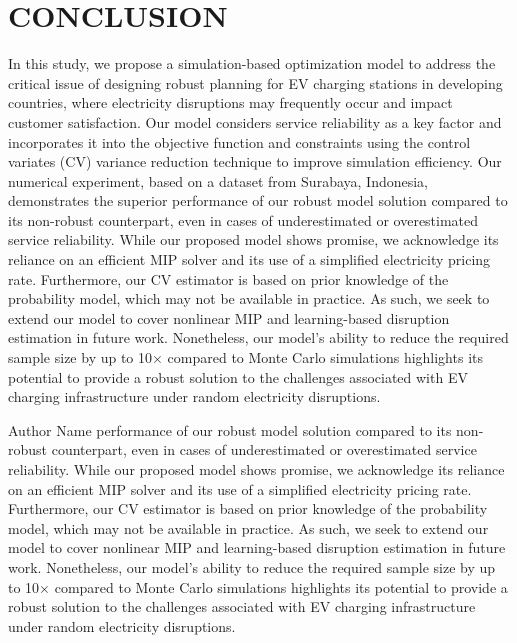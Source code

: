 \documentclass[preprint]{oscmjournal}
\theoremstyle{remark}
\begin{document}
\section{CONCLUSION}
\label{sec:conclusion}

In this study, we propose a simulation-based optimization model to address the critical issue of designing robust planning for EV charging stations in developing countries, where electricity disruptions may frequently occur and impact customer satisfaction. Our model considers service reliability as a key factor and incorporates it into the objective function and constraints using the control variates (CV) variance reduction technique to improve simulation efficiency. Our numerical experiment, based on a dataset from Surabaya, Indonesia, demonstrates the superior performance of our robust model solution compared to its non-robust counterpart, even in cases of underestimated or overestimated service reliability. While our proposed model shows promise, we acknowledge its reliance on an efficient MIP solver and its use of a simplified electricity pricing rate. Furthermore, our CV estimator is based on prior knowledge of the probability model, which may not be available in practice. As such, we seek to extend our model to cover nonlinear MIP and learning-based disruption estimation in future work. Nonetheless, our model's ability to reduce the required sample size by up to 10$\times$ compared to Monte Carlo simulations highlights its potential to provide a robust solution to the challenges associated with EV charging infrastructure under random electricity disruptions.


\printbibliography[title={REFERENCES}]

\biographies
\begin{biography}{Author Name}
performance of our robust model solution compared to its non-robust counterpart, even in cases of underestimated or overestimated service reliability. While our proposed model shows promise, we acknowledge its reliance on an efficient MIP solver and its use of a simplified electricity pricing rate. Furthermore, our CV estimator is based on prior knowledge of the probability model, which may not be available in practice. As such, we seek to extend our model to cover nonlinear MIP and learning-based disruption estimation in future work. Nonetheless, our model's ability to reduce the required sample size by up to 10$\times$ compared to Monte Carlo simulations highlights its potential to provide a robust solution to the challenges associated with EV charging infrastructure under random electricity disruptions.
\end{biography}
\end{document}
